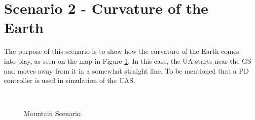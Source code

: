 \newpage
\section{Scenario 2 - Curvature of the Earth}\label{sec:scenario2}
The purpose of this scenario is to show how the curvature of the Earth comes into play, as seen on the map in Figure \ref{fig:s2_map}. In this case, the UA starts near the GS and moves away from it in a somewhat straight line. To be mentioned that a PD controller is used in simulation of the UAS.

\begin{figure}[H]
	\centering
	\\
	\caption{Mountain Scenario}
	\label{fig:s2_map}
\end{figure}


